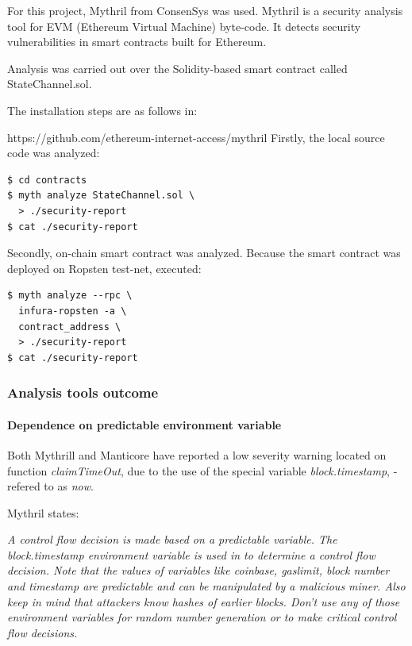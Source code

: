 \documentclass[12pt]{amsart}
\begin{document}
\begin{multicols}{2}
\vspace{0.35cm}

For this project, Mythril from ConsenSys was used. Mythril is a
security analysis tool for EVM (Ethereum Virtual Machine) byte-code.
It detects security vulnerabilities in smart contracts built for Ethereum.

\vspace{0.35cm}

Analysis was carried out over the Solidity-based smart contract called
StateChannel.sol.

\vspace{0.35cm}

The installation steps are as follows in:

\vspace{0.35cm}

https://github.com/ethereum-internet-access/mythril
Firstly, the local source code was analyzed:

\begin{verbatim}
$ cd contracts
$ myth analyze StateChannel.sol \
  > ./security-report
$ cat ./security-report
\end{verbatim}

\vspace{0.35cm}

Secondly, on-chain smart contract was analyzed.
Because the smart contract was deployed on Ropsten test-net,  executed:

\begin{verbatim}
$ myth analyze --rpc \
  infura-ropsten -a \
  contract_address \
  > ./security-report
$ cat ./security-report
\end{verbatim}


\subsubsection{Analysis tools outcome}

\paragraph{Dependence on predictable environment variable}

Both Mythrill and Manticore have reported a low severity warning located on function
\textit{claimTimeOut}, due to the use of the special variable \textit{block.timestamp}, -refered
to as \textit{now}.

Mythril states:

\textit{A control flow decision is made based
on a predictable variable. The block.timestamp environment variable is used in to determine
a control flow decision. Note that the values of variables like coinbase, gaslimit,
block number and timestamp are predictable and can be manipulated by a malicious miner.
Also keep in mind that attackers know hashes of earlier blocks. Don't use any of those
environment variables for random number generation or to make critical control flow decisions.}


\end{multicols}
\end{document}
